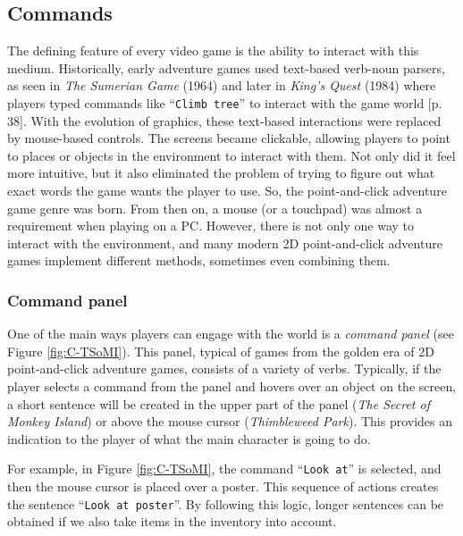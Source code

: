 \subsection{Commands}
\label{sec:Commands}
The defining feature of every video game is the ability to interact with this medium. Historically, early adventure games used text-based verb-noun parsers, as seen in \textit{The Sumerian Game} (1964) and later in \textit{King's Quest} (1984) where players typed commands like “\texttt{Climb tree}” to interact with the game world \cite{Salter2014}[p. 38]. With the evolution of graphics, these text-based interactions were replaced by mouse-based controls. The screens
became clickable, allowing players to point to places or objects in the environment to interact with them.  Not only did it feel more intuitive, but it also eliminated the problem of trying to figure out what exact words the game wants the player to use. So, the point-and-click adventure game genre was born. From then on, a mouse (or a touchpad) was almost a requirement when playing on a PC. However, there is not only one way to interact with the environment, and many modern 2D point-and-click adventure games implement different methods, sometimes even combining them.

\subsubsection{Command panel}
One of the main ways players can engage with the world is a \textit{command panel} (see Figure \ref{fig:C-TSoMI}). This panel, typical of games from the golden era of 2D point-and-click adventure games, consists of a variety of verbs. Typically, if the player selects a command from the panel and hovers over an object on the screen, a short sentence will be created in the upper part of the panel (\textit{The Secret of Monkey Island}) or above the mouse cursor (\textit{Thimbleweed Park}). This provides an indication to the player of what the main character is going to do. 

For example, in Figure \ref{fig:C-TSoMI}, the command “\texttt{Look at}” is selected, and then the mouse cursor is placed over a poster. This sequence of actions creates the sentence “\texttt{Look at poster}”. By following this logic, longer sentences can be obtained if we also take items in the inventory into account. 

